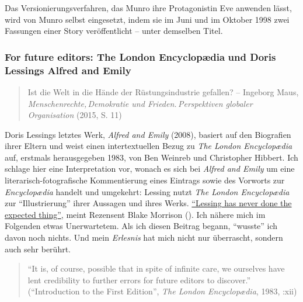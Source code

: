\documentclass[fontsize=12pt]{scrartcl}
\begin{document}
Das Versionierungsverfahren, das Munro ihre Protagonistin\textsuperscript{\tiny *} Eve anwenden l\"asst, wird von Munro \mbox{selbst} eingesetzt, indem sie im Juni und im Oktober 1998 zwei Fassungen einer Story ver\"of\-fent\-licht -- unter demselben Titel.

\pagebreak

\subsubsection{\flq For future editors\frq: \flq The London Encyclop{\ae}dia\frq \,\,und Doris Lessings \flq Alfred and Emily\frq}
\label{subsubsec:5.4.2}

\singlespacing
\begin{quote}
{\footnotesize Ist die Welt in die H\"ande der R\"ustungsindustrie gefallen? -- Ingeborg Maus, \textit{Menschenrechte,\,Demokratie und Frieden.\,Perspektiven globaler\,Organisation} (2015, S. 11)}\newline
\end{quote}
\onehalfspacing

Doris Lessings letztes Werk, \textit{Alfred and Emily} (2008), basiert auf den Biografien ihrer Eltern und weist einen intertextuellen Bezug zu \textit{The London Encyclop{\ae}dia} auf, erstmals he\-rausgegeben 1983, von Ben Weinreb und Christopher Hibbert. Ich schlage \mbox{hier} eine Interpretation vor, wonach es sich bei \textit{Alfred and Emily} um eine li\-te\-ra\-risch-fotografische Kommentierung eines Eintrags sowie des Vorworts zur \textit{Encyclop{\ae}dia} handelt und umgekehrt: Lessing nutzt \textit{The London Encyclop{\ae}dia} zur "`Illustrierung"' ihrer Aussagen und ihres Werks.
\href{http://www.theguardian.com/books/2008/may/17/fiction.dorislessing}{"`Lessing has never done the expected thing"'}, meint Rezensent Blake Morrison (\cite{Morrison2008}). Ich n\"ahere mich im Folgenden etwas Unerwartetem. Als ich diesen Beitrag begann, "`wusste"' ich davon noch nichts. Und mein \textit{Erlesnis} hat mich nicht nur \"uberrascht, sondern auch sehr ber\"uhrt.

\singlespacing
\begin{quote} 
"`It is, of course, possible that in spite of infinite care, we ourselves have lent credibility to further errors for future editors to discover."'\\
("`Introduction to the First Edition"', \textit{The London Encyclop{\ae}dia}, 1983, \cite{Weinreb1983}:xii)
\end{quote} 
\onehalfspacing
\end{document}
